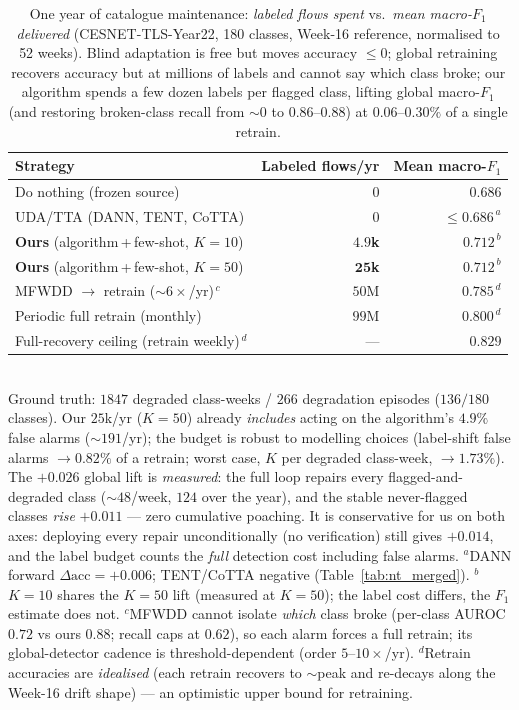 \begin{table}[t]
\centering
\caption{One year of catalogue maintenance: \emph{labeled flows spent} vs.\
\emph{mean macro-$F_1$ delivered} (CESNET-TLS-Year22, 180 classes, Week-16 reference,
normalised to 52 weeks). Blind adaptation is free but moves accuracy $\le 0$; global
retraining recovers accuracy but at millions of labels and cannot say which class
broke; our algorithm spends a few dozen labels per flagged class, lifting global
macro-$F_1$ (and restoring broken-class recall from ${\sim}0$ to $0.86$--$0.88$) at
$0.06$--$0.30\%$ of a single retrain.}
\label{tab:labelcost}
\setlength{\tabcolsep}{4pt}
\begin{tabular}{@{}lrr@{}}
\hline
\textbf{Strategy} & \textbf{Labeled flows/yr} & \textbf{Mean macro-$F_1$} \\
\hline
Do nothing (frozen source)            & $0$      & $0.686$ \\
UDA/TTA (DANN, TENT, CoTTA)            & $0$      & $\le 0.686^{\,a}$ \\
\textbf{Ours} (algorithm\,+\,few-shot, $K{=}10$) & $\mathbf{4.9}$\textbf{k} & $\mathbf{0.712}^{\,b}$ \\
\textbf{Ours} (algorithm\,+\,few-shot, $K{=}50$) & $\mathbf{25}$\textbf{k}  & $\mathbf{0.712}^{\,b}$ \\
MFWDD $\rightarrow$ retrain (${\sim}6\times$/yr)$^{\,c}$ & $50$M & $0.785^{\,d}$ \\
Periodic full retrain (monthly)       & $99$M    & $0.800^{\,d}$ \\
Full-recovery ceiling (retrain weekly)$^{\,d}$ & ---     & $0.829$ \\
\hline
\end{tabular}
\\[2pt]
\footnotesize{Ground truth: $1847$ degraded class-weeks / $266$ degradation episodes
($136/180$ classes). Our $25$k/yr ($K{=}50$) already \emph{includes} acting on the
algorithm's $4.9\%$ false alarms (${\sim}191$/yr); the budget is robust to modelling
choices (label-shift false alarms $\to0.82\%$ of a retrain; worst case, $K$ per
degraded class-week, $\to1.73\%$). The $+0.026$ global lift is \emph{measured}: the
full loop repairs every flagged-and-degraded class (${\sim}48$/week, $124$ over the
year), and the stable never-flagged classes \emph{rise} $+0.011$ --- zero cumulative
poaching. It is conservative for us on both axes: deploying every repair
unconditionally (no verification) still gives $+0.014$, and the label budget counts
the \emph{full} detection cost including false alarms.
$^{a}$DANN forward $\Delta\text{acc}{=}{+}0.006$; TENT/CoTTA negative (Table~\ref{tab:nt_merged}).
$^{b}$$K{=}10$ shares the $K{=}50$ lift (measured at $K{=}50$); the label cost differs, the $F_1$ estimate does not.
$^{c}$MFWDD cannot isolate \emph{which} class broke (per-class AUROC $0.72$ vs ours $0.88$;
recall caps at $0.62$), so each alarm forces a full retrain; its global-detector cadence
is threshold-dependent (order $5$--$10\times$/yr).
$^{d}$Retrain accuracies are \emph{idealised} (each retrain recovers to ${\sim}$peak and
re-decays along the Week-16 drift shape) --- an optimistic upper bound for retraining.}
\end{table}

